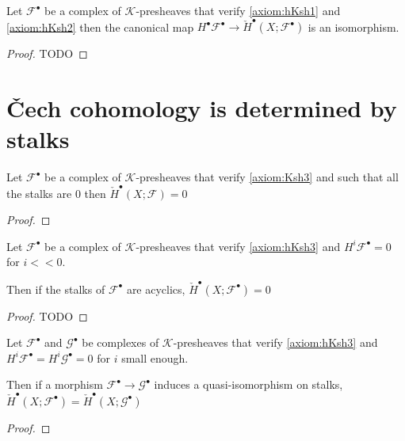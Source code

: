 \begin{proposition}\label{prop:homotopy_k_sheaf_compute_chech}
    Let $\mathcal{F}^{\bullet}$ be a complex of $\mathcal{K}$-presheaves that verify \eqref{axiom:hKsh1} and \eqref{axiom:hKsh2} then the canonical map $H^{\bullet}\mathcal{F}^{\bullet}\to \check{H}^{\bullet}(X;\mathcal{F}^{\bullet})$ is an isomorphism.
\end{proposition}

\begin{proof}
    TODO

\end{proof}

\section{\v{C}ech cohomology is determined by stalks}

\begin{lemma}\label{lem:chech_is_determined_by_stalks_1}
    Let $\mathcal{F}^{\bullet}$ be a complex of $\mathcal{K}$-presheaves that verify \eqref{axiom:Ksh3} and such that all the stalks are $0$ then $\check{H}^{\bullet}(X;\mathcal{F})=0$
    
\end{lemma}

\begin{proof}
\end{proof}

\begin{lemma}\label{lem:chech_is_determined_by_stalks_2}
    Let $\mathcal{F}^{\bullet}$ be a complex of $\mathcal{K}$-presheaves that verify \eqref{axiom:hKsh3} and $H^i\mathcal{F}^{\bullet}=0$ for $i<<0$.
    
    Then if the stalks of $\mathcal{F}^{\bullet}$ are acyclics, $\check{H}^{\bullet}(X;\mathcal{F}^{\bullet})=0$

\end{lemma}

\begin{proof}
    TODO
\end{proof}


\begin{proposition}\label{prop:chech_is_determined_by_stalks_3}
    Let $\mathcal{F}^{\bullet}$ and $\mathcal{G}^{\bullet}$ be complexes of $\mathcal{K}$-presheaves that verify \eqref{axiom:hKsh3} and $H^i\mathcal{F}^{\bullet}=H^i\mathcal{G}^{\bullet}=0$ for $i$ small enough.
    
    Then if a morphism $\mathcal{F}^{\bullet}\to \mathcal{G}^{\bullet}$ induces a quasi-isomorphism on stalks, $\check{H}^{\bullet}(X;\mathcal{F}^{\bullet})=\check{H}^{\bullet}(X;\mathcal{G}^{\bullet})$
\end{proposition}

\begin{proof}
\end{proof}